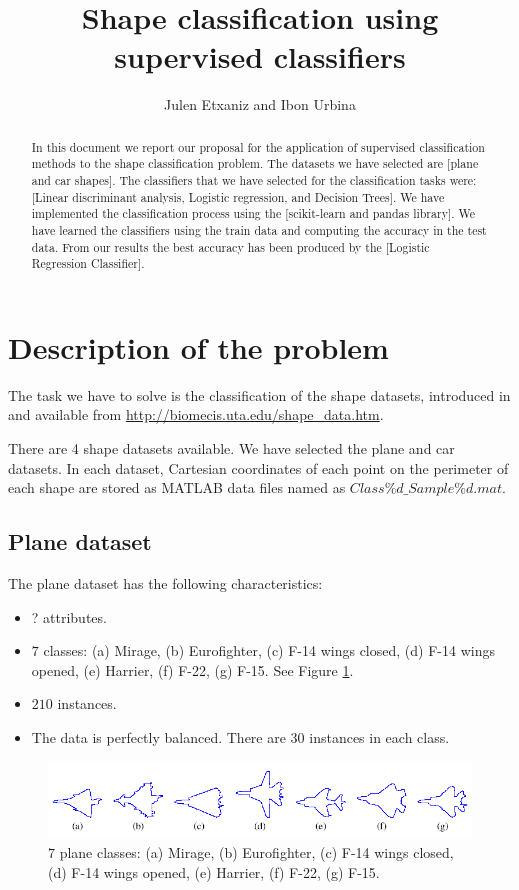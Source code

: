 \documentclass{article} %
\title{Shape classification using supervised classifiers}
\author{Julen Etxaniz and Ibon Urbina}
\begin{document}
\maketitle

\begin{abstract}
  In this document we report our proposal for the 	application of supervised classification methods to the shape classification problem. The datasets we have selected are [plane and car shapes]. The classifiers that we have selected for the classification tasks were: [Linear discriminant analysis, Logistic regression, and Decision Trees]. We have implemented the classification process using the [scikit-learn and pandas library]. We have learned the classifiers using the train data and computing the accuracy in the test data. From our results the best accuracy has been produced by the [Logistic Regression Classifier].
\end{abstract}

\tableofcontents
\newpage

\section{Description of the problem}
The task we have to solve is the classification of the shape datasets, introduced in \cite{Siebert:1987} and available from \url{http://biomecis.uta.edu/shape_data.htm}. 
 
There are 4 shape datasets available. We have selected the plane and car datasets. In each dataset, Cartesian coordinates of each point on the perimeter of each shape are stored as MATLAB data files named as $Class\%d\_Sample\%d.mat$.

\subsection{Plane dataset}
The plane dataset has the following characteristics:
\begin{itemize}
    \item ? attributes.
    \item $7$ classes: (a) Mirage, (b) Eurofighter, (c) F-14 wings closed, (d) F-14 wings opened, (e) Harrier, (f) F-22, (g) F-15. See Figure \ref{fig:plane}.
    \item $210$ instances. 
    \item The data is perfectly balanced. There are 30 instances in each class.
\end{itemize}

\begin{figure}[ht]
    \centering
    \includegraphics[width=\linewidth]{shape_plane.png}
    \caption{$7$ plane classes: (a) Mirage, (b) Eurofighter, (c) F-14 wings closed, (d) F-14 wings opened, (e) Harrier, (f) F-22, (g) F-15.}
    \label{fig:plane}
\end{figure}
\end{document}
